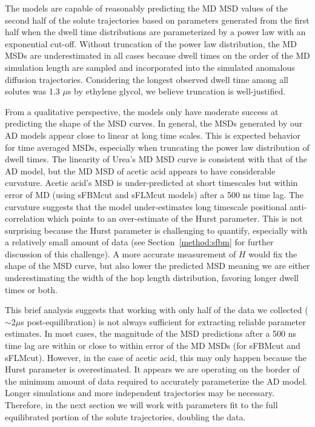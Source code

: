 \documentclass{article}
\begin{document}
  The models are capable of reasonably predicting the MD MSD values of the second
  half of the solute trajectories based on parameters generated from the first half
  when the dwell time distributions are parameterized by a power law with an 
  exponential cut-off. Without truncation of the power law distribution, the MD 
  MSDs are underestimated in all cases because dwell times on the order of the
  MD simulation length are sampled and incorporated into the simulated anomalous
  diffusion trajectories. Considering the longest observed dwell time among all
  solutes was 1.3 $\mu$s by ethylene glycol, we believe truncation is well-justified.
  
  
  From a qualitative perspective, the models only have moderate success at predicting
  the shape of the MSD curves. In general, the MSDs generated by our AD models appear
  close to linear at long time scales. This is expected behavior for time averaged 
  MSDs, especially when truncating the power law distribution of dwell times.
  \cite{molina-garcia_crossover_2018} The linearity of Urea's MD MSD curve is 
  consistent with that of the AD model, but the MD MSD of acetic acid appears to have considerable
  curvature. Acetic acid's MSD is under-predicted at short timescales but within error 
  of MD (using sFBMcut and sFLMcut models) after a 500 ns time lag. The curvature suggests that the 
  model under-estimates long timescale positional anti-correlation which points to an
  over-estimate of the Hurst parameter. This is not surprising because the Hurst 
  parameter is challenging to quantify, especially with a relatively small amount of 
  data (see Section~\ref{method:sfbm} for further discussion of this challenge).
  A more accurate measurement of $H$ would fix the shape of the MSD curve, but also
  lower the predicted MSD meaning we are either underestimating the width of the hop
  length distribution, favoring longer dwell times or both.
  
  This brief analysis suggests that working with only half of the data we collected
  ($\sim$2$\mu$s post-equilibration) is not always sufficient for extracting reliable
  parameter estimates. In most cases, the magnitude of the MSD predictions after a 
  500 ns time lag are within or close to within error of the MD MSDs (for sFBMcut and
  sFLMcut). However, in the case of acetic acid, this may only happen because the 
  Hurst parameter is overestimated. It appears we are operating on the border of the
  minimum amount of data required to accurately parameterize the AD model. Longer
  simulations and more independent trajectories may be necessary. Therefore, in 
  the next section we will work with parameters fit to the full equilibrated portion
  of the solute trajectories, doubling the data.
\end{document}
